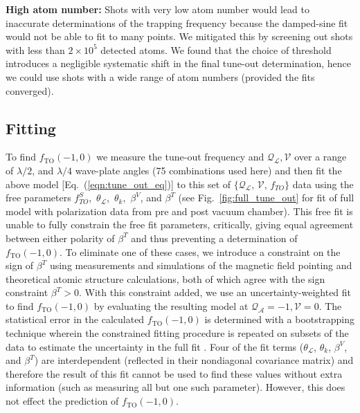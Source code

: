 	\textbf{High atom number:}		Shots with very low atom number would lead to inaccurate determinations of the trapping frequency because the damped-sine fit would not be able to fit to many points. We mitigated this by screening out shots with less than $2\times10^{5}$ detected atoms. We found that the choice of threshold introduces a negligible systematic shift in the final tune-out determination, hence we could use shots with a wide range of atom numbers (provided the fits converged).


\subsection{Fitting}
 
	To find \(f_{\mathrm{TO}}(-1,0)\) we measure the tune-out frequency and \(\mathcal{Q_{L}},\mathcal{V}\) over a range of $\lambda/2$, and $\lambda/4$ wave-plate angles (75 combinations used here) and then fit the above model [Eq.~(\ref{eqn:tune_out_eq})] to this set of \(\{\mathcal{Q_{L}},\, \mathcal{V},\, f_{TO}\}\) data using the free parameters $f^{S}_{TO}$,\, $\theta_{\mathcal{L}}$,\, $\theta_{k}$,\, $\beta^V$, and $\beta^T$ (see Fig.~\ref{fig:full_tune_out} for fit of full model with polarization data from pre and post vacuum chamber). This free fit is unable to fully constrain the free fit parameters, critically, giving equal agreement between either polarity of \( \beta^T \) and thus preventing a determination of \(f_{\mathrm{TO}}(-1,0)\). 
	To eliminate one of these cases, we introduce a constraint on the sign of  \( \beta^T \) using  measurements and simulations of the magnetic field pointing and theoretical atomic structure calculations, both of which agree with the sign constraint \( \beta^T >0 \).
	With this constraint added, we use an uncertainty-weighted fit to find \(f_{\mathrm{TO}}(-1,0)\) by evaluating the resulting model at \(\mathcal{Q_{A}}=-1,\mathcal{V}=0\). The statistical error in the calculated \(f_{\mathrm{TO}}(-1,0)\) is determined with a bootstrapping technique wherein the constrained fitting procedure is repeated on subsets of the data to estimate the uncertainty in the full fit \cite{bryce_bootstrap_error_code}. 
	Four of the fit terms ($\theta_{\mathcal{L}}$, $\theta_{k}$, $\beta^V$, and $\beta^T$) are interdependent (reflected in their nondiagonal covariance matrix) and therefore the result of this fit cannot be used to find these values without extra information (such as measuring all but one such parameter). However, this does not effect the prediction of \(f_{\mathrm{TO}}(-1,0)\).

